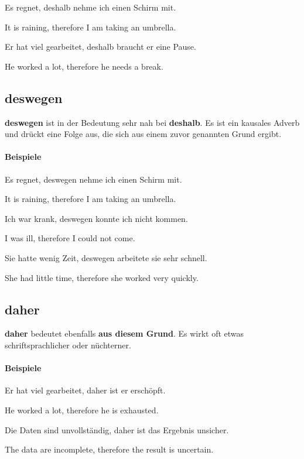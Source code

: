 \documentclass[a4paper]{article}
\newcommand{\EN}[1]{\par{\small\textcolor{TranslationGray}{#1}}\vspace{0.25em}}
\begin{document}
            Es regnet, deshalb nehme ich einen Schirm mit.\\
            \EN{It is raining, therefore I am taking an umbrella.}
            
            Er hat viel gearbeitet, deshalb braucht er eine Pause.\\
            \EN{He worked a lot, therefore he needs a break.}
    
    \subsection{deswegen}
    \textbf{deswegen} ist in der Bedeutung sehr nah bei \textbf{deshalb}. Es ist ein kausales Adverb und drückt eine Folge aus, die sich aus einem zuvor genannten Grund ergibt.
    
    \paragraph{Beispiele}
        Es regnet, deswegen nehme ich einen Schirm mit.\\
        \EN{It is raining, therefore I am taking an umbrella.}
        
        Ich war krank, deswegen konnte ich nicht kommen.\\
        \EN{I was ill, therefore I could not come.}
        
        Sie hatte wenig Zeit, deswegen arbeitete sie sehr schnell.\\
        \EN{She had little time, therefore she worked very quickly.}
    
    \subsection{daher}
    \textbf{daher} bedeutet ebenfalls \textbf{aus diesem Grund}. Es wirkt oft etwas schriftsprachlicher oder nüchterner.
    
    \paragraph{Beispiele}
        Er hat viel gearbeitet, daher ist er erschöpft.\\
        \EN{He worked a lot, therefore he is exhausted.}
        
        Die Daten sind unvollständig, daher ist das Ergebnis unsicher.\\
        \EN{The data are incomplete, therefore the result is uncertain.}
        
\end{document}
